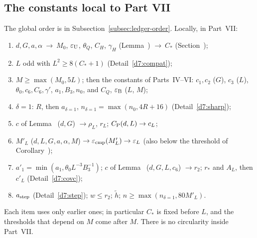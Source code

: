 \subsection{The constants local to Part VII}\label{d7:order-sec}

\begin{detail}\label{d7:order}
The global order is in Subsection~\ref{subsec:ledger-order}. Locally, in Part~VII:
\begin{enumerate}[label=(\arabic*)]
\item $d,G,a,\alpha\ \to\ M_0$, $\varepsilon_{\rm U}$, $\theta_Q$, $C_H$, $\gamma_H$ (Lemma~) $\to\ C_*$ (Section~);
\item $L$ odd with $L^2\ge8(C_*+1)$ (Detail~\ref{d7:compat});
\item $M\ge\max(M_0,5L)$; then the constants of Parts~IV--VI: $c_1,c_2$ ($G$), $c_3$ ($L$), $\theta_0,c_6,C_6,\gamma'$, $a_1,B_3,n_0$, and $C_Q$, $\varepsilon_{\rm B}$ ($L$, $M$);
\item $\delta=1$: $R$, then $a_{\delta=1}$, $n_{\delta=1}=\max(n_0,4R+16)$ (Detail~\ref{d7:sharp});
\item $c$ of Lemma~ ($d,G$) $\to\rho_L$, $r_L$; $C_{\rm P}(d,L)\to c_L$;
\item $M'_L$ ($d,L,G,a,\alpha,M$) $\to\varepsilon_{\rm cmp}(M'_L)\to\varepsilon_L$ (also below the threshold of Corollary~);
\item $a'_1=\min(a_1,\theta_0L^{-3}B_3^{-1})$; $c$ of Lemma~ ($d,G,L,c_6$) $\to r_2$; $r_*$ and $A_L$, then $c'_L$ (Detail~\ref{d7:covc});
\item $a_{\rm step}$ (Detail~\ref{d7:step}); $w\le r_2$; $\tilde h$; $n\ge\max(n_{\delta=1},80M'_L)$.
\end{enumerate}
Each item uses only earlier ones; in particular $C_*$ is fixed before $L$, and the thresholds that depend on $M$ come after $M$. There is no circularity inside Part~VII.
\end{detail}
